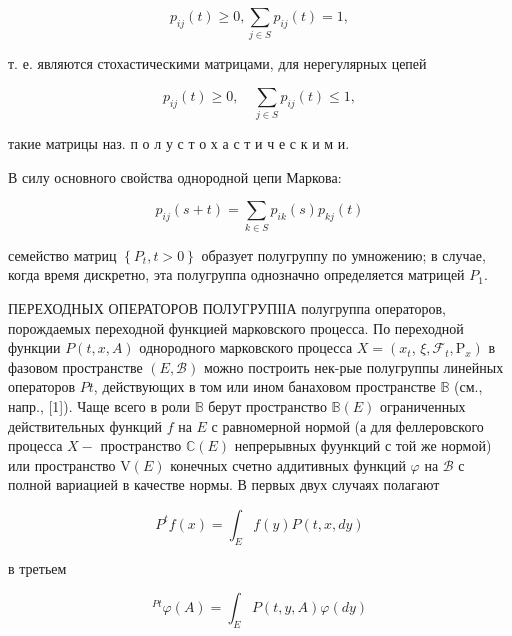 \documentclass[10pt]{article}
\begin{document}
\[

p_{i j}(t) \geqslant 0, \sum_{j \in S} p_{i j}(t)=1,

\]



т. е. являются стохастическими матрицами, для нерегулярных цепей



\[

p_{i j}(t) \geqslant 0, \quad \sum_{j \in S} p_{i j}(t) \leqslant 1,

\]



такие матрицы наз. п о л у с т о х а с т и ч е с к и м и.



В силу основного свойства однородной цепи Маркова:



\[

p_{i j}(s+t)=\sum_{k \in S} p_{i k}(s) p_{k j}(t)

\]



семейство матриц $\left\{P_{t}, t>0\right\}$ образует полугруппу по умножению; в случае, когда время дискретно, эта полугруппа однозначно определяется матрицей $P_{1}$.



ПЕРЕХОДНЫХ ОПЕРАТОРОВ ПОЛУГРУПІІА полугруппа операторов, порождаемых переходной функцией марковского процесса. По переходной функции $P(t, x, A)$ однородного марковского процесса $X=\left(x_{t}\right.$, $\left.\xi, \mathcal{F}_{t}, \mathrm{P}_{x}\right)$ в фазовом пространстве $(E, \mathscr{B})$ можно построить нек-рые полугруппы линейных операторов $P t$, действующих в том или ином банаховом пространстве $\mathbb{B}$ (см., напр., [1]). Чаще всего в роли $\mathbb{B}$ берут пространство $\mathbb{B}(E)$ ограниченных действительных функций $f$ на $E$ с равномерной нормой (а для феллеровского процесса $X-$ пространство $\mathbb{C}(E)$ непрерывных фуункций с той же нормой) или пространство $\mathrm{V}(E)$ конечных счетно аддитивных функций $\varphi$ на $\mathscr{B}$ с полной вариацией в качестве нормы. В первых двух случаях полагают



\[

P^{t} f(x)=\int_{E} f(y) P(t, x, d y)

\]



в третьем



\[

{ }^{P t} \varphi(A)=\int_{E} P(t, y, A) \varphi(d y)

\]
\end{document}
